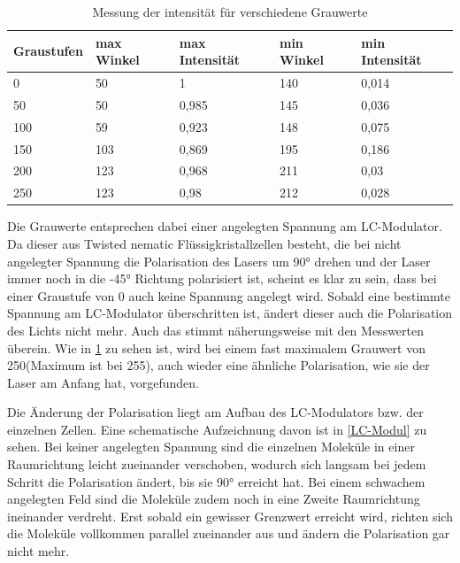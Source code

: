 \begin{table}[]
	\caption{Messung der intensität für verschiedene Grauwerte }
	\label{tab:grauwert}
	\begin{tabular}{l|llll}
		Graustufen & max Winkel & max Intensität & min Winkel & min Intensität \\ \hline
		0          & 50         & 1              & 140        & 0,014          \\
		50         & 50         & 0,985          & 145        & 0,036          \\
		100        & 59         & 0,923          & 148        & 0,075          \\
		150        & 103        & 0,869          & 195        & 0,186          \\
		200        & 123        & 0,968          & 211        & 0,03           \\
		250        & 123        & 0,98           & 212        & 0,028         
	\end{tabular}
\end{table}



Die Grauwerte entsprechen dabei einer angelegten Spannung am LC-Modulator. Da dieser aus Twisted nematic Flüssigkristallzellen besteht, die bei nicht angelegter Spannung die Polarisation des Lasers um 90° drehen und der Laser immer noch in die -45° Richtung polarisiert ist, scheint es klar zu sein, dass bei einer Graustufe von 0 auch keine Spannung angelegt wird. Sobald eine bestimmte Spannung am LC-Modulator überschritten ist, ändert dieser auch die Polarisation des Lichts nicht mehr. Auch das stimmt näherungsweise mit den Messwerten überein. Wie in \cref{tab:grauwert} zu sehen ist, wird bei einem fast maximalem Grauwert von 250(Maximum ist bei 255), auch wieder eine ähnliche Polarisation, wie sie der Laser am Anfang hat, vorgefunden. 

Die Änderung der Polarisation liegt am Aufbau des LC-Modulators bzw. der einzelnen Zellen. Eine schematische Aufzeichnung davon ist in \cref{LC-Modul} zu sehen. Bei keiner angelegten Spannung sind die einzelnen Moleküle in einer Raumrichtung leicht zueinander verschoben, wodurch sich langsam  bei jedem Schritt die Polarisation ändert, 
bis sie 90° erreicht hat. Bei einem schwachem angelegten Feld sind die Moleküle zudem noch in eine Zweite Raumrichtung ineinander verdreht. Erst sobald ein gewisser Grenzwert erreicht wird, richten sich die Moleküle vollkommen parallel zueinander aus und ändern die Polarisation gar nicht mehr. 

